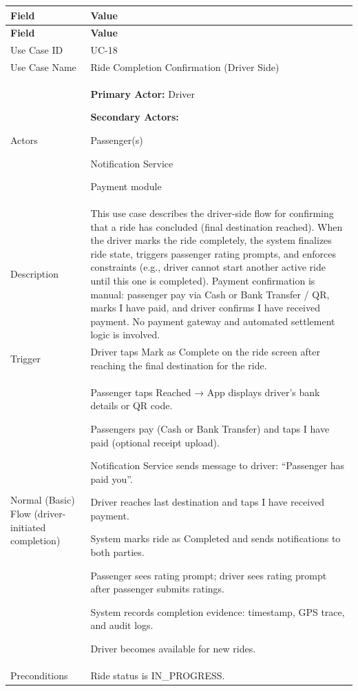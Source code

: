 \begin{longtable}{|p{3.5cm}|p{12cm}|}
\hline
\rowcolor{lightgray!30}
\textbf{Field} & \textbf{Value} \\
\hline
\endfirsthead
\hline
\rowcolor{lightgray!30}
\textbf{Field} & \textbf{Value} \\
\hline
\endhead
\hline
\endfoot
Use Case ID & UC-18 \\
\hline
Use Case Name & Ride Completion Confirmation (Driver Side) \\
\hline
Actors &
\textbf{Primary Actor:} Driver

\textbf{Secondary Actors:}

Passenger(s)

Notification Service

Payment module \\
\hline
Description &
This use case describes the driver-side flow for confirming that a ride has concluded (final destination reached). When the driver marks the ride completely, the system finalizes ride state, triggers passenger rating prompts, and enforces constraints (e.g., driver cannot start another active ride until this one is completed). Payment confirmation is manual: passenger pay via Cash or Bank Transfer / QR, marks I have paid, and driver confirms I have received payment. No payment gateway and automated settlement logic is involved. \\
\hline
Trigger &
Driver taps Mark as Complete on the ride screen after reaching the final destination for the ride. \\
\hline
Normal (Basic) Flow (driver-initiated completion) &
Passenger taps Reached → App displays driver’s bank details or QR code.

Passengers pay (Cash or Bank Transfer) and taps I have paid (optional receipt upload).

Notification Service sends message to driver: “Passenger has paid you”.

Driver reaches last destination and taps I have received payment.

System marks ride as Completed and sends notifications to both parties.

Passenger sees rating prompt; driver sees rating prompt after passenger submits ratings.

System records completion evidence: timestamp, GPS trace, and audit logs.

Driver becomes available for new rides. \\
\hline
Preconditions &
Ride status is IN\_PROGRESS.


\end{longtable}
